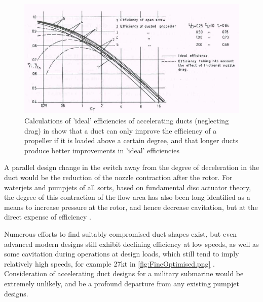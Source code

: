 \documentclass{article}\usepackage[]{graphicx}\usepackage[]{color}
\begin{document}
\begin{figure}
\includegraphics[width=\textwidth]{AcceleratingIdeal.png}
\caption{Calculations of 'ideal' efficiencies of accelerating ducts (neglecting drag) in \cite{oosterveld1970} show that a duct can only improve the efficiency of a propeller if it is loaded above a certain degree, and that longer ducts produce better improvements in 'ideal' efficiencies}
\label{fig:AcceleratingIdeal.png}
\end{figure}

A parallel design change in the switch away from the degree of deceleration in the duct would be the reduction of the nozzle contraction after the rotor.  For waterjets and pumpjets of all sorts, based on fundamental disc actuator theory, the degree of this contraction of the flow area has also been long identified as a means to increase pressure at the rotor, and hence decrease cavitation, but at the direct expense of efficiency \parencite[14]{van1996waterjet}.

Numerous efforts to find suitably compromised duct shapes exist, but even advanced modern designs still exhibit declining efficiency at low speeds, as well as some cavitation during operations at design loads, which still tend to imply relatively high speeds, for example 27kt in \ref{fig:FineOptimised.png} .  Consideration of accelerating duct designs for a military submarine would be extremely unlikely, and be a profound departure from any existing pumpjet designs.
\end{document}
